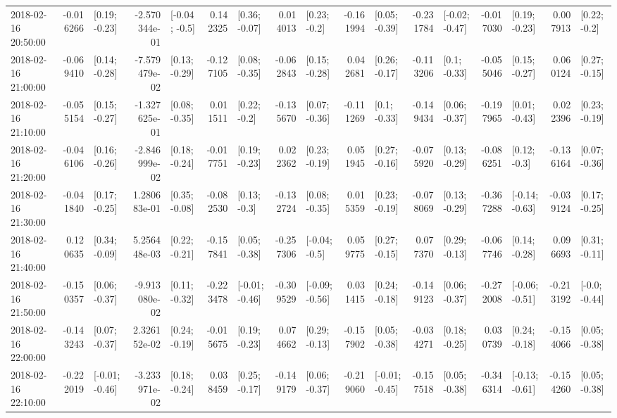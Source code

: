 \begin{tabular}{lrlrlrlrlrlrlrlrl}
2018-02-16 20:50:00 & -0.016266 &   [0.19; -0.23] & -2.570344e-01 &   [-0.04; -0.5] &  0.142325 &   [0.36; -0.07] &  0.014013 &    [0.23; -0.2] & -0.161994 &   [0.05; -0.39] & -0.231784 &  [-0.02; -0.47] & -0.017030 &   [0.19; -0.23] &  0.007913 &    [0.22; -0.2] \\
2018-02-16 21:00:00 & -0.069410 &   [0.14; -0.28] & -7.579479e-02 &   [0.13; -0.29] & -0.127105 &   [0.08; -0.35] & -0.062843 &   [0.15; -0.28] &  0.042681 &   [0.26; -0.17] & -0.113206 &    [0.1; -0.33] & -0.055046 &   [0.15; -0.27] &  0.060124 &   [0.27; -0.15] \\
2018-02-16 21:10:00 & -0.055154 &   [0.15; -0.27] & -1.327625e-01 &   [0.08; -0.35] &  0.011511 &    [0.22; -0.2] & -0.135670 &   [0.07; -0.36] & -0.111269 &    [0.1; -0.33] & -0.149434 &   [0.06; -0.37] & -0.197965 &   [0.01; -0.43] &  0.022396 &   [0.23; -0.19] \\
2018-02-16 21:20:00 & -0.046106 &   [0.16; -0.26] & -2.846999e-02 &   [0.18; -0.24] & -0.017751 &   [0.19; -0.23] &  0.022362 &   [0.23; -0.19] &  0.051945 &   [0.27; -0.16] & -0.075920 &   [0.13; -0.29] & -0.086251 &    [0.12; -0.3] & -0.136164 &   [0.07; -0.36] \\
2018-02-16 21:30:00 & -0.041840 &   [0.17; -0.25] &  1.280683e-01 &   [0.35; -0.08] & -0.082530 &    [0.13; -0.3] & -0.132724 &   [0.08; -0.35] &  0.015359 &   [0.23; -0.19] & -0.078069 &   [0.13; -0.29] & -0.367288 &  [-0.14; -0.63] & -0.039124 &   [0.17; -0.25] \\
2018-02-16 21:40:00 &  0.120635 &   [0.34; -0.09] &  5.256448e-03 &   [0.22; -0.21] & -0.157841 &   [0.05; -0.38] & -0.257306 &   [-0.04; -0.5] &  0.059775 &   [0.27; -0.15] &  0.077370 &   [0.29; -0.13] & -0.067746 &   [0.14; -0.28] &  0.096693 &   [0.31; -0.11] \\
2018-02-16 21:50:00 & -0.150357 &   [0.06; -0.37] & -9.913080e-02 &   [0.11; -0.32] & -0.223478 &  [-0.01; -0.46] & -0.309529 &  [-0.09; -0.56] &  0.031415 &   [0.24; -0.18] & -0.149123 &   [0.06; -0.37] & -0.272008 &  [-0.06; -0.51] & -0.213192 &   [-0.0; -0.44] \\
2018-02-16 22:00:00 & -0.143243 &   [0.07; -0.37] &  2.326152e-02 &   [0.24; -0.19] & -0.015675 &   [0.19; -0.23] &  0.074662 &   [0.29; -0.13] & -0.157902 &   [0.05; -0.38] & -0.034271 &   [0.18; -0.25] &  0.030739 &   [0.24; -0.18] & -0.154066 &   [0.05; -0.38] \\
2018-02-16 22:10:00 & -0.222019 &  [-0.01; -0.46] & -3.233971e-02 &   [0.18; -0.24] &  0.038459 &   [0.25; -0.17] & -0.149179 &   [0.06; -0.37] & -0.219060 &  [-0.01; -0.45] & -0.157518 &   [0.05; -0.38] & -0.346314 &  [-0.13; -0.61] & -0.154260 &   [0.05; -0.38] \\

\end{tabular}
